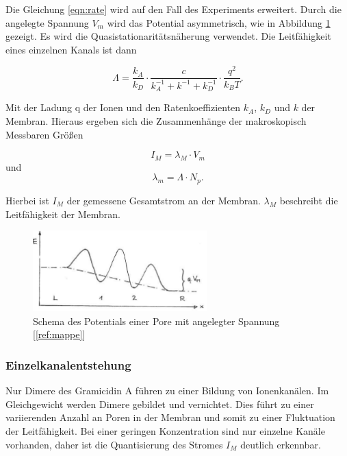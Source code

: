 \documentclass[a4paper,ngerman]{scrartcl}
\begin{document}
Die Gleichung \ref{eqn:rate} wird auf den Fall des Experiments erweitert. Durch die angelegte Spannung $V_{m}$ wird das Potential asymmetrisch, wie in Abbildung \ref{fig:potential-asym} gezeigt.  Es wird die Quasistationaritätsnäherung verwendet. Die Leitfähigkeit eines einzelnen Kanals ist dann

\begin{equation}
\Lambda = \frac{k_A}{k_D} \cdot \frac{c}{k_A^{-1}+k^{-1}+k_D^{-1}} \cdot  \frac{q^2}{k_B T} .
\end{equation}

Mit der Ladung q der Ionen und den Ratenkoeffizienten $k_A$, $k_D$ und $k$ der Membran.
Hieraus ergeben sich die Zusammenhänge der makroskopisch Messbaren Größen

\begin{equation}
I_M = \lambda_M \cdot V_m
\end{equation}
und
\begin{equation}\label{eqn:transport-leitfaehigkeit}
\lambda_m = \Lambda \cdot N_p.
\end{equation}

Hierbei ist $I_M$ der gemessene Gesamtstrom an der Membran. $\lambda_M$ beschreibt die Leitfähigkeit der Membran.


\begin{figure}
\includegraphics[width=0.6\textwidth]{abbildungen/potential-asym.png}
\caption{Schema des Potentials einer Pore mit angelegter Spannung [\ref{ref:mappe}]}
\label{fig:potential-asym}
\end{figure}



\subsubsection{Einzelkanalentstehung}

Nur Dimere des Gramicidin A führen zu einer Bildung von Ionenkanälen. Im Gleichgewicht werden Dimere gebildet und vernichtet. Dies führt zu einer variierenden Anzahl an Poren in der Membran und somit zu einer Fluktuation der Leitfähigkeit. Bei einer geringen Konzentration sind nur einzelne Kanäle vorhanden, daher ist die Quantisierung des Stromes $I_M$ deutlich erkennbar.
\end{document}
